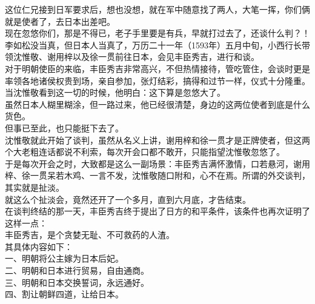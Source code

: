 \begin{multicols}{\theparacolNo}
这位仁兄接到日军要求后，想也没想，就在军中随意找了两人，大笔一挥，你们俩就是使者了，去日本出差吧。\\

现在忽悠你们，那是不得已，老子手里要是有兵，早就打过去了，还谈什么判？！\\

李如松没当真，但日本人当真了，万历二十一年（1593年）五月中旬，小西行长带领沈惟敬、谢用梓以及徐一贯前往日本，会见丰臣秀吉，进行和谈。\\

对于明朝使臣的来临，丰臣秀吉非常高兴，不但热情接待，管吃管住，会谈时更是率领各地诸侯权贵到场，亲自参加，张灯结彩，搞得和过节一样，仪式十分隆重。\\

当沈惟敬看到这一切的时候，他明白：这下算是忽悠大了。\\

虽然日本人糊里糊涂，但一路过来，他已经很清楚，身边的这两位使者到底是什么货色。\\

但事已至此，也只能挺下去了。\\

沈惟敬就此开始了谈判，虽然从名义上讲，谢用梓和徐一贯才是正牌使者，但这两个大老粗连话都说不利索，每次开会口都不敢开，只能指望沈惟敬忽悠了。\\

于是每次开会之时，大致都是这么一副场景：丰臣秀吉满怀激情，口若悬河，谢用梓、徐一贯呆若木鸡、一言不发，沈惟敬随口附和，心不在焉。所谓的外交谈判，其实就是扯淡。\\

就这么个扯淡会，竟然还开了一个多月，直到六月底，才告结束。\\

在谈判终结的那一天，丰臣秀吉终于提出了日方的和平条件，该条件也再次证明了这样一点：\\

丰臣秀吉，是个贪婪无耻、不可救药的人渣。\\

其具体内容如下：\\

一、明朝将公主嫁为日本后妃。\\

二、明朝和日本进行贸易，自由通商。\\

三、明朝和日本交换誓词，永远通好。\\

四、割让朝鲜四道，让给日本。\\


\end{multicols}
